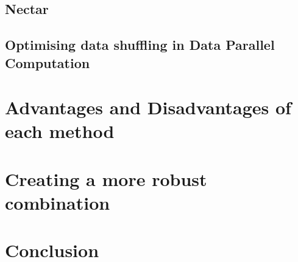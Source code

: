 \documentclass[]{article}
\begin{document}
\subsection{Nectar}

\subsection{Optimising data shuffling in Data Parallel Computation}

\section{Advantages and Disadvantages of each method}
\subsection{}

\subsection{}

\subsection{}

\subsection{}

\subsection{}

\section{Creating a more robust combination}

\section{Conclusion}
\end{document}
